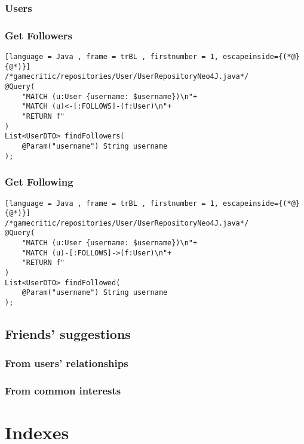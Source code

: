 \subsubsection{Users}
\subsubsection{Get Followers}
\begin{lstlisting}[language = Java , frame = trBL , firstnumber = 1, escapeinside={(*@}{@*)}]
/*gamecritic/repositories/User/UserRepositoryNeo4J.java*/
@Query(
	"MATCH (u:User {username: $username})\n"+
	"MATCH (u)<-[:FOLLOWS]-(f:User)\n"+
	"RETURN f"
)
List<UserDTO> findFollowers(
	@Param("username") String username
);
\end{lstlisting}
\subsubsection{Get Following}
\begin{lstlisting}[language = Java , frame = trBL , firstnumber = 1, escapeinside={(*@}{@*)}]
/*gamecritic/repositories/User/UserRepositoryNeo4J.java*/
@Query(
	"MATCH (u:User {username: $username})\n"+
	"MATCH (u)-[:FOLLOWS]->(f:User)\n"+
	"RETURN f"
)
List<UserDTO> findFollowed(
	@Param("username") String username
);
\end{lstlisting}
\subsection{Friends' suggestions}
\subsubsection{From users' relationships}
\subsubsection{From common interests}
\section{Indexes}
